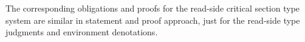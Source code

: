 The corresponding obligations and proofs for the read-side critical section type system are similar in statement and proof approach, just for the read-side type judgments and environment denotations.
